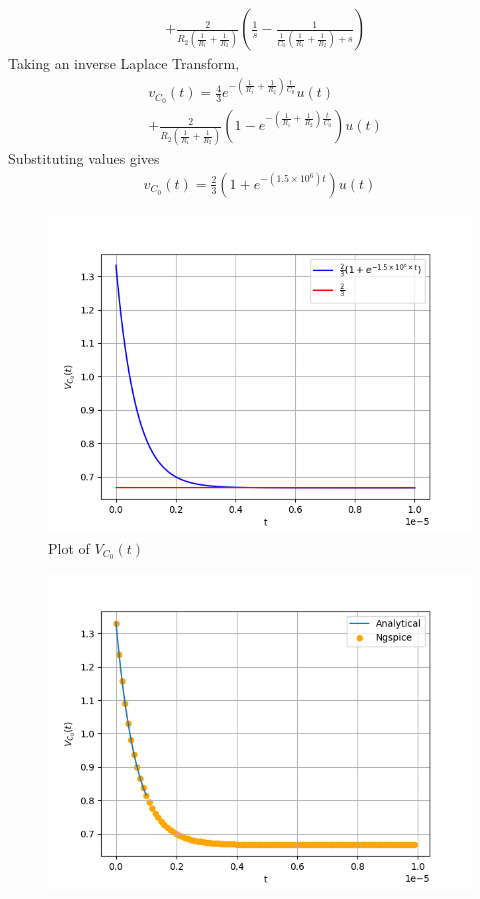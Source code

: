 \documentclass[journal,12pt,twocolumn]{IEEEtran}
\providecommand{\brak}[1]{\ensuremath{\left(#1\right)}}
\numberwithin{equation}{section}
\renewcommand\thesection{\arabic{section}}
\begin{document}
\begin{enumerate}[label=\arabic*.,ref=\thesection.\theenumi]
\begin{align}
    &+ \frac{2}{R_2\brak{\frac{1}{R_1} +\frac{1}{R_2}}}\brak{\frac{1}{s} - \frac{1}{\frac{1}{C_0}\brak{\frac{1}{R_1} + \frac{1}{R_2}} + s}}
\end{align}
Taking an inverse Laplace Transform,
\begin{align}
    &v_{C_0}(t) = \frac{4}{3}e^{-\brak{\frac{1}{R_1} + \frac{1}{R_2}}\frac{t}{C_0}}u(t) \nonumber \\ 
    &+ \frac{2}{R_2\brak{\frac{1}{R_1}+\frac{1}{R_2}}}\brak{1 - e^{-\brak{\frac{1}{R_1} + \frac{1}{R_2}}\frac{t}{C_0}}}u(t)
\end{align}
Substituting values gives
\begin{align}
    v_{C_0}(t) = \frac{2}{3}\brak{1 +e^{-\brak{1.5 \times 10^6}t}}u(t)
    \label{eq:v2-t}
\end{align}
\begin{figure}[!ht]
			\centering
			\includegraphics[width=\columnwidth]{figs/3.4.png}
			\caption{Plot of $V_{C_0}(t)$}
\end{figure}
	\begin{figure}[!ht]
	\centering
	\includegraphics[width=\columnwidth]{figs/3.5.png}

\end{figure}
\end{enumerate}
\end{document}

